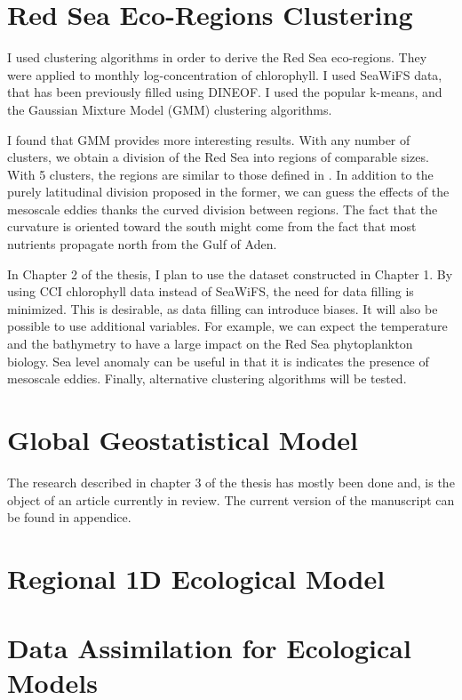 \section{Red Sea Eco-Regions Clustering}

I used clustering algorithms in order to derive the Red Sea eco-regions. They
were applied to monthly log-concentration of chlorophyll. I used SeaWiFS data,
that has been previously filled using DINEOF. I used the popular k-means, and
the Gaussian Mixture Model (GMM) clustering algorithms.

I found that GMM provides more interesting results. With any number of
clusters, we obtain a division of the Red Sea into regions of comparable sizes.
With 5 clusters, the regions are similar to those defined in
\citet{Raitsos2013}. In addition to the purely latitudinal division proposed in
the former, we can guess the effects of the mesoscale eddies thanks the curved
division between regions. The fact that the curvature is oriented toward the
south might come from the fact that most nutrients propagate north from the
Gulf of Aden.

In Chapter 2 of the thesis, I plan to use the dataset constructed in Chapter 1.
By using CCI chlorophyll data instead of SeaWiFS, the need for data filling is
minimized. This is desirable, as data filling can introduce biases. It will
also be possible to use additional variables. For example, we can expect the
temperature and the bathymetry to have a large impact on the Red Sea
phytoplankton biology. Sea level anomaly can be useful in that it is indicates
the presence of mesoscale eddies. Finally, alternative clustering algorithms
will be tested.

\section{Global Geostatistical Model}

The research described in chapter 3 of the thesis has mostly been done and, is
the object of an article currently in review. The current version of the
manuscript can be found in appendice.

\section{Regional 1D Ecological Model}

\section{Data Assimilation for Ecological Models}


